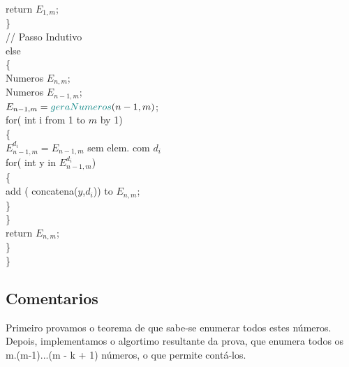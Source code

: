 \documentclass[twoside]{article}
\begin{document}
\begin{multicols}{2}
\hspace*{10mm} {\color[rgb]{0.5,0,1} return} $E_{1,m}$;\\
\hspace*{5mm} \}\\
\hspace*{5mm} {\color[rgb]{0,0.5,0}// Passo Indutivo}\\
\hspace*{5mm} {\color[rgb]{0.7,0.3,0} else}\\
\hspace*{5mm} \{\\
\hspace*{10mm} {\color[rgb]{0,0,1} Numeros} $E_{n,m}$;\\
\hspace*{10mm} {\color[rgb]{0,0,1} Numeros} $E_{n-1,m}$;\\
\hspace*{10mm} $E_{n-1,m} = {\color[rgb]{0,0.5,0.5} geraNumeros}(n-1,m)$;\\
\hspace*{10mm} {\color[rgb]{0.7,0.3,0} for}({\color[rgb]{0,0,1} int} i {\color[rgb]{0.7,0.3,0} from} 1 {\color[rgb]{0.7,0.3,0} to} $m$ {\color[rgb]{0.7,0.3,0} by} 1)\\
\hspace*{10mm} \{\\
\hspace*{15mm} $E_{n-1,m}^{d_i} = E_{n-1,m}$ {\color[rgb]{0,0.5,0.5}sem elem. com} $d_i$\\
\hspace*{15mm} {\color[rgb]{0.7,0.3,0} for}({\color[rgb]{0,0,1} int} y {\color[rgb]{0.7,0.3,0} in} $E_{n-1,m}^{d_i}$)\\
\hspace*{15mm} \{\\
\hspace*{20mm} {\color[rgb]{0,0.5,0.5} add} ({\color[rgb]{0,0.5,0.5} concatena}($y$,$d_i$)) {\color[rgb]{0,0.5,0.5} to} $E_{n,m}$;\\
\hspace*{15mm} \}\\
\hspace*{10mm} \}\\
\hspace*{10mm} {\color[rgb]{0.5,0,1} return}  $E_{n,m}$;\\
\hspace*{5mm} \}\\
\}\\

\subsection{ Comentarios }
\indent  Primeiro provamos o teorema de que sabe-se enumerar todos estes números.
Depois, implementamos o algortimo resultante da prova, que enumera todos os m.(m-1)...(m - k + 1) números, o que permite contá-los.\\




\end{multicols}
\end{document}
